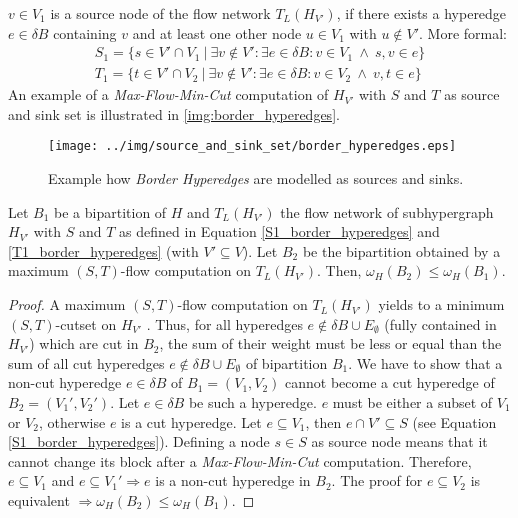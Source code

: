 $v \in V_1$ is a source node of the flow network $T_L(H_{V'})$, if there exists
a hyperedge $e \in \delta B$ containing $v$ and at least one other node $u \in V_1$ with
$u \notin V'$. More formal:
\begin{align}
S_1 = \{ s \in V' \cap V_1\ |\ \exists v \notin V': \exists e \in \delta B: v \in V_1\ \land\ s,v \in e \} \label{S1_border_hyperedges}\\
T_1 = \{ t \in V' \cap V_2\ |\ \exists v \notin V': \exists e \in \delta B: v \in V_2\ \land\ v,t \in e \} \label{T1_border_hyperedges}
\end{align}
An example of a \emph{Max-Flow-Min-Cut} computation of $H_{V'}$ with $S$ and $T$ as source and
sink set is illustrated in \autoref{img:border_hyperedges}.
\begin{figure}
\centering
\texttt{[image: ../img/source\_and\_sink\_set/border\_hyperedges.eps]}
\caption{Example how \emph{Border Hyperedges} are modelled as sources and sinks.}
\label{img:border_hyperedges}
\end{figure}

\begin{lemma}
\label{cut_decrease_proof}
Let $B_1$ be a bipartition of $H$ and $T_L(H_{V'})$ the flow network of subhypergraph
$H_{V'}$ with $S$ and $T$ as defined in Equation \ref{S1_border_hyperedges} and \ref{T1_border_hyperedges} (with $V' \subseteq V$).
Let $B_2$ be the bipartition obtained by a maximum $(S,T)$-flow computation on $T_L(H_{V'})$.
Then, $\omega_H(B_2) \le \omega_H(B_1)$.
\end{lemma}

\begin{proof}
A maximum $(S,T)$-flow computation on $T_L(H_{V'})$ yields to a minimum $(S,T)$-cutset on 
$H_{V'}$ \cite{ford1956maximal}. Thus, for all hyperedges $e \notin \delta B \cup E_{\emptyset}$ (fully contained in $H_{V'}$)
which are cut in $B_2$, the sum of their weight must be less or equal than the sum of all cut hyperedges
$e \notin \delta B \cup E_{\emptyset}$ of bipartition $B_1$. We have to show that a non-cut
hyperedge $e \in \delta B$ of $B_1 = (V_1,V_2)$ cannot become a cut hyperedge of
$B_2 = (V_1',V_2')$. Let $e \in \delta B$ be such a hyperedge. $e$ must be either a subset of $V_1$ or $V_2$, otherwise
$e$ is a cut hyperedge. Let $e \subseteq V_1$, then $e \cap V' \subseteq S$ (see Equation \ref{S1_border_hyperedges}). 
Defining a node $s \in S$ as source node means that it cannot change its block after a \emph{Max-Flow-Min-Cut}
computation. Therefore, $e \subseteq V_1$ and $e \subseteq V_1' \Rightarrow e$ is a non-cut
hyperedge in $B_2$. The proof for $e \subseteq V_2$ is equivalent $\Rightarrow \omega_H(B_2) 
\le \omega_H(B_1)$.
\end{proof} 

